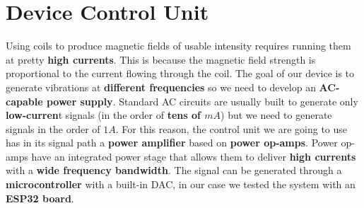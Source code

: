 \section{Device Control Unit}
Using coils to produce magnetic fields of usable intensity requires running them at pretty \textbf{high currents}.
This is because the magnetic field strength is proportional to the current flowing through the coil.
The goal of our device is to generate vibrations at \textbf{different frequencies} so we need to develop an \textbf{AC-capable power supply}.
Standard AC circuits are usually built to generate only \textbf{low-curren}t signals (in the order of \textbf{tens of $mA$}) but we need to generate signals in the order of \textbf{$1A$}.
For this reason, the control unit we are going to use has in its signal path a \textbf{power amplifier} based on \textbf{power op-amps}. Power op-amps have an integrated power stage that allows them to deliver \textbf{high currents} with a \textbf{wide frequency bandwidth}.
The signal can be generated through a \textbf{microcontroller} with a built-in DAC, in our case we tested the system with an \textbf{ESP32 board}.